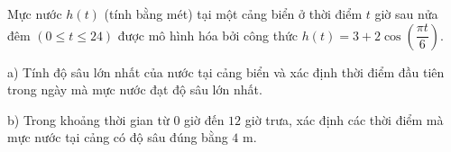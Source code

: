 \begin{ex}
Mực nước $h(t)$ (tính bằng mét) tại một cảng biển ở thời điểm $t$ giờ sau nửa đêm $(0\le t\le24)$ được mô hình hóa bởi công thức $h(t)=3+2\cos\left(\dfrac{\pi t}{6}\right)$.

a) Tính độ sâu lớn nhất của nước tại cảng biển và xác định thời điểm đầu tiên trong ngày mà mực nước đạt độ sâu lớn nhất.

b) Trong khoảng thời gian từ $0$ giờ đến $12$ giờ trưa, xác định các thời điểm mà mực nước tại cảng có độ sâu đúng bằng $4$ m.
\end{ex}
